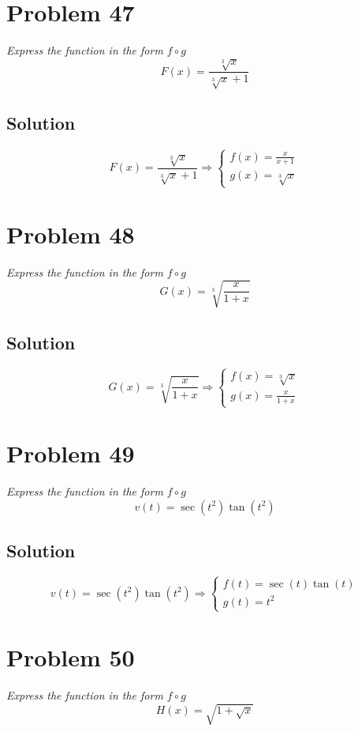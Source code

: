 \documentclass[11pt]{article}
\newcommand{\soln}{\subsection*}
\newcommand{\qn}{\textit}
\begin{document}
\section*{Problem 47}

\qn{Express the function in the form $f \circ g$ $$F(x)=\frac{\sqrt[3]{x}}{\sqrt[3]{x}+1}$$}

\soln{Solution}
\begin{equation*}
	F(x)=\frac{\sqrt[3]{x}}{\sqrt[3]{x}+1}
	\Rightarrow
	\begin{cases}
		f(x) = \frac{x}{x+1}\\
		g(x) = \sqrt[3]{x}
	\end{cases}
\end{equation*}

\section*{Problem 48}

\qn{Express the function in the form $f \circ g$ $$G(x)=\sqrt[3]{\frac{x}{1+x}}$$}

\soln{Solution}
\begin{equation*}
	G(x)=\sqrt[3]{\frac{x}{1+x}}
	\Rightarrow
	\begin{cases}
		f(x) = \sqrt[3]{x}\\
		g(x) = \frac{x}{1+x}
	\end{cases}
\end{equation*}

\section*{Problem 49}

\qn{Express the function in the form $f \circ g$ $$v(t)=\sec(t^2)\tan(t^2)$$}

\soln{Solution}
\begin{equation*}
	v(t)=\sec(t^2)\tan(t^2)
	\Rightarrow
	\begin{cases}
		f(t) = \sec(t)\tan(t)\\
		g(t) = t^2
	\end{cases}
\end{equation*}

\section*{Problem 50}

\qn{Express the function in the form $f \circ g$ $$H(x)=\sqrt{1+\sqrt{x}}$$}
\end{document}
